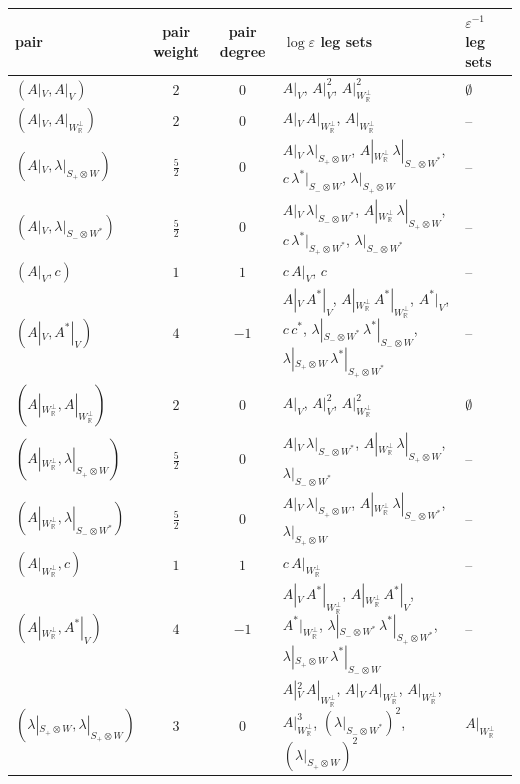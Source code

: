 \begin{tabular}{l|c|c|l|l}
pair & pair weight & pair degree & $\log\varepsilon$ leg sets & $\varepsilon^{-1}$ leg sets\\
\hline
$(A|_V,A|_V)$ & $2$ & $0$ & $A|_V$, $A|_V^2$, $A|_{W_{\mathbb R}^\perp}^2$ & $\emptyset$\\
$(A|_V,A|_{W_{\mathbb R}^\perp})$ & $2$ & $0$ & $A|_V\,A|_{W_{\mathbb R}^\perp}$, $A|_{W_{\mathbb R}^\perp}$ & --\\
$(A|_V,\lambda|_{S_+\otimes W})$ & $\tfrac{5}{2}$ & $0$ & $A|_V\,\lambda|_{S_+\otimes W}$, $A|_{W_{\mathbb R}^\perp}\,\lambda|_{S_-\otimes W^*}$, $c\,\lambda^*|_{S_-\otimes W}$, $\lambda|_{S_+\otimes W}$ & --\\
$(A|_V,\lambda|_{S_-\otimes W^*})$ & $\tfrac{5}{2}$ & $0$ & $A|_V\,\lambda|_{S_-\otimes W^*}$, $A|_{W_{\mathbb R}^\perp}\,\lambda|_{S_+\otimes W}$, $c\,\lambda^*|_{S_+\otimes W^*}$, $\lambda|_{S_-\otimes W^*}$ & --\\
$(A|_V,c)$ & $1$ & $1$ & $c\,A|_V$, $c$ & --\\
$(A|_V,A^*|_V)$ & $4$ & $-1$ & $A|_V\,A^*|_V$, $A|_{W_{\mathbb R}^\perp}\,A^*|_{W_{\mathbb R}^\perp}$, $A^*|_V$, $c\,c^*$, $\lambda|_{S_-\otimes W^*}\,\lambda^*|_{S_-\otimes W}$, $\lambda|_{S_+\otimes W}\,\lambda^*|_{S_+\otimes W^*}$ & --\\
$(A|_{W_{\mathbb R}^\perp},A|_{W_{\mathbb R}^\perp})$ & $2$ & $0$ & $A|_V$, $A|_V^2$, $A|_{W_{\mathbb R}^\perp}^2$ & $\emptyset$\\
$(A|_{W_{\mathbb R}^\perp},\lambda|_{S_+\otimes W})$ & $\tfrac{5}{2}$ & $0$ & $A|_V\,\lambda|_{S_-\otimes W^*}$, $A|_{W_{\mathbb R}^\perp}\,\lambda|_{S_+\otimes W}$, $\lambda|_{S_-\otimes W^*}$ & --\\
$(A|_{W_{\mathbb R}^\perp},\lambda|_{S_-\otimes W^*})$ & $\tfrac{5}{2}$ & $0$ & $A|_V\,\lambda|_{S_+\otimes W}$, $A|_{W_{\mathbb R}^\perp}\,\lambda|_{S_-\otimes W^*}$, $\lambda|_{S_+\otimes W}$ & --\\
$(A|_{W_{\mathbb R}^\perp},c)$ & $1$ & $1$ & $c\,A|_{W_{\mathbb R}^\perp}$ & --\\
$(A|_{W_{\mathbb R}^\perp},A^*|_V)$ & $4$ & $-1$ & $A|_V\,A^*|_{W_{\mathbb R}^\perp}$, $A|_{W_{\mathbb R}^\perp}\,A^*|_V$, $A^*|_{W_{\mathbb R}^\perp}$, $\lambda|_{S_-\otimes W^*}\,\lambda^*|_{S_+\otimes W^*}$, $\lambda|_{S_+\otimes W}\,\lambda^*|_{S_-\otimes W}$ & --\\
$(\lambda|_{S_+\otimes W},\lambda|_{S_+\otimes W})$ & $3$ & $0$ & $A|_V^2\,A|_{W_{\mathbb R}^\perp}$, $A|_V\,A|_{W_{\mathbb R}^\perp}$, $A|_{W_{\mathbb R}^\perp}$, $A|_{W_{\mathbb R}^\perp}^3$, $(\lambda|_{S_-\otimes W^*})^2$, $(\lambda|_{S_+\otimes W})^2$ & $A|_{W_{\mathbb R}^\perp}$\\

\end{tabular}
